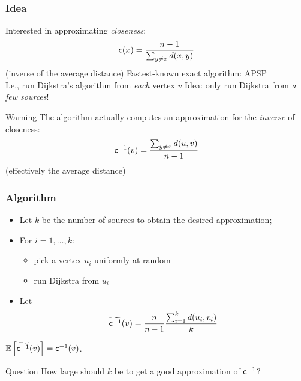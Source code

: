 \begin{frame}
  \frametitle{Idea}
  \vfill
  Interested in approximating \emph{closeness}:
  \[
    \mathsf{c}(x)=\frac{n-1}{\sum_{y\neq x}d(x,y)}
  \]
  (inverse of the average distance)
  \vfill
  Fastest-known exact algorithm: APSP\\
  \qquad I.e., run Dijkstra's algorithm from \emph{each} vertex $v$
  \pause
  \vfill
  Idea: only run Dijkstra from \emph{a few sources}!
  \vfill
  \pause
  \begin{block}{Warning}
    The algorithm actually computes an approximation for
    the \emph{inverse} of closeness:
    \[
      \mathsf{c}^{-1}(v)=\frac{\sum_{y\neq x}d(u,v)}{n-1}
    \]
    (effectively the average distance)
  \end{block}
\end{frame}

\begin{frame}
  \frametitle{Algorithm}
  \begin{block}{}
    \begin{itemize}
      \item Let $k$ be the number of sources to obtain the desired
        approximation;
        \pause
      \item For $i=1,\dotsc, k$:
        \begin{itemize}
          \item pick a vertex $u_i$ uniformly at random
            \pause
          \item run Dijkstra from $u_i$
        \end{itemize}
      \item Let
        \[
          \widetilde{\mathsf{c}^{-1}}(v)=\frac{n}{n-1}\frac{\sum_{i=1}^k
          d(u_i,v_i)}{k}
        \]
    \end{itemize}
  \end{block}
  \pause
  \begin{theorem}
    $\mathbb{E}\left[\widetilde{\mathsf{c}^{-1}}(v)\right]=\mathsf{c}^{-1}(v)$.
  \end{theorem}
  \pause
  \begin{block}{Question}
    How large should $k$ be to get a good approximation of $\mathsf{c}^{-1}$?
  \end{block}
\end{frame}

